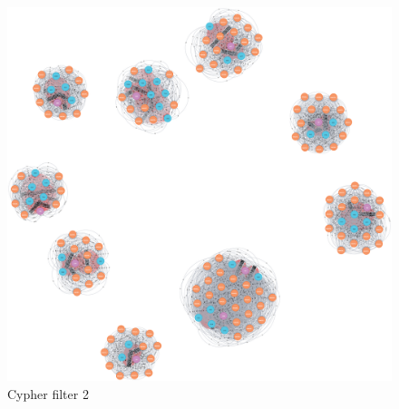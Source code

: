 \begin{landscape}
  \begin{figure}[H]
    \includegraphics[scale=0.15]{img/Neo4j/graph1-filter.png}
    \centering
    \caption{Cypher filter 2}
    \label{fig:Graph 2 filtered}
  \end{figure}
\end{landscape}